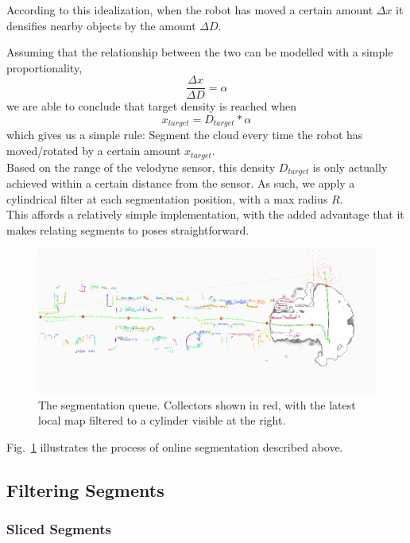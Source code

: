 According to this idealization, when the robot has moved a certain amount $\Delta x$ it densifies nearby objects by the amount $\Delta D$.

Assuming that the relationship between the two can be modelled with a simple proportionality,
$$\frac{\Delta x}{\Delta D} = \alpha$$
we are able to conclude that target density is reached when
$$x_{target} = D_{target} * \alpha$$
which gives us a simple rule: Segment the cloud every time the robot has moved/rotated by a certain amount $x_{target}$.\\

Based on the range of the velodyne sensor, this density $D_{target}$ is only actually achieved within a certain distance from the sensor. As such, we apply a cylindrical filter at each segmentation position, with a max radius $R$.\\

This affords a relatively simple implementation, with the added advantage that it makes relating segments to poses straightforward.\\



\begin{figure}
  \centering
  \includegraphics[width=5.2in]{images/seg_queue.png}
  \caption{The segmentation queue. Collectors shown in red, with the latest local map filtered to a cylinder visible at the right.}
  \label{fig:seg-queue}
\end{figure}

Fig.~\ref{fig:seg-queue} illustrates the process of online segmentation described above.
\subsection{Filtering Segments}

\label{subsec:filtering-segments}

\subsubsection{Sliced Segments}
\label{subsub:sec:sliced}

